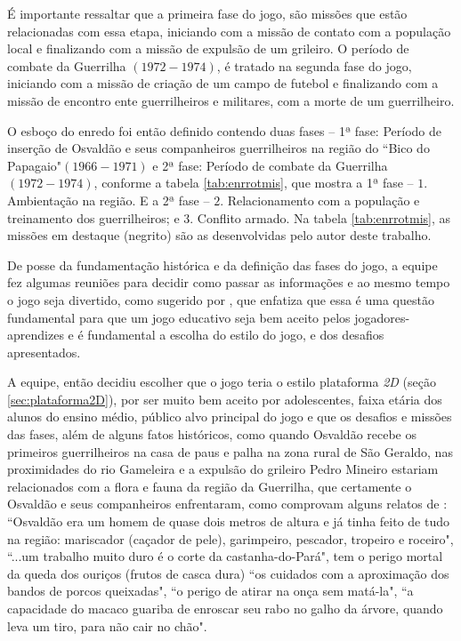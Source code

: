 É importante ressaltar que a primeira fase do jogo, são missões que estão relacionadas com essa etapa, iniciando com a missão de contato com a população local e finalizando com a missão de expulsão de um grileiro. O período de combate da Guerrilha $(1972-1974)$, é tratado na segunda fase do jogo, iniciando com a missão de criação de um campo de futebol e finalizando com a missão de encontro ente guerrilheiros e militares, com a morte de um guerrilheiro.

O esboço do enredo foi então definido contendo duas fases -- 1ª fase: Período de inserção de Osvaldão e seus companheiros guerrilheiros na região do ``Bico do Papagaio"\space$(1966-1971)$ e 2ª fase: Período de combate da Guerrilha $(1972-1974)$, conforme a tabela \ref{tab:enrrotmis}, que mostra a 1ª fase -- $1.$ Ambientação na região. E a 2ª fase -- $2.$ Relacionamento com a população e treinamento dos guerrilheiros; e $3.$ Conflito armado. Na tabela \ref{tab:enrrotmis}, as missões em destaque (negrito) são as desenvolvidas pelo autor deste trabalho.



De posse da fundamentação histórica e da definição das fases do jogo, a equipe fez algumas reuniões para decidir como passar as informações e ao mesmo tempo o jogo seja divertido, como sugerido por , que enfatiza que essa é uma questão fundamental para que um jogo educativo seja bem aceito pelos jogadores-aprendizes e é fundamental a escolha do estilo do jogo, e dos desafios apresentados.

A equipe, então decidiu escolher que o jogo teria o estilo plataforma \textit{2D} (seção \ref{sec:plataforma2D}), por ser muito bem aceito por adolescentes, faixa etária dos alunos do ensino médio, público alvo principal do jogo e que os desafios e missões das fases, além de alguns fatos históricos, como quando Osvaldão recebe os primeiros guerrilheiros na casa de paus e palha na zona rural de São Geraldo, nas proximidades do rio Gameleira e a expulsão do grileiro Pedro Mineiro estariam relacionados com a flora e fauna da região da Guerrilha, que certamente o Osvaldão e seus companheiros enfrentaram, como comprovam alguns relatos de : ``Osvaldão era um homem de quase dois metros de altura e já tinha feito de tudo na região: mariscador (caçador de pele), garimpeiro, pescador, tropeiro e roceiro", ``...um trabalho muito duro é o corte da castanha-do-Pará", tem o perigo mortal da queda dos ouriços (frutos de casca dura) ``os cuidados com a aproximação dos bandos de porcos queixadas", ``o perigo de atirar na onça sem matá-la", ``a capacidade do macaco guariba de enroscar seu rabo no galho da árvore, quando leva um tiro, para não cair no chão".

